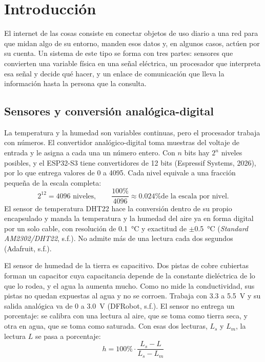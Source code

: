 \documentclass[12pt, letterpaper]{article}
\begin{document}
\newpage

\section{Introducción}

El internet de las cosas consiste en conectar objetos de uso diario a una red para que midan algo de su entorno, manden
esos datos y, en algunos casos, actúen por su cuenta. Un sistema de este tipo se forma con tres partes: sensores que
convierten una variable física en una señal eléctrica, un procesador que interpreta esa señal y decide qué hacer, y un
enlace de comunicación que lleva la información hasta la persona que la consulta.

\subsection{Sensores y conversión analógica-digital}

La temperatura y la humedad son variables continuas, pero el procesador trabaja con números. El convertidor
analógico-digital toma muestras del voltaje de entrada y le asigna a cada una un número entero. Con $n$ bits hay $2^n$
niveles posibles, y el ESP32-S3 tiene convertidores de 12 bits (Espressif Systems, 2026), por lo que entrega valores de
0 a 4095. Cada nivel equivale a una fracción pequeña de la escala completa:
\[
2^{12} = 4096 \text{ niveles}, \qquad \frac{100\text{\%}}{4096} \approx 0.024\text{\% de la escala por nivel.}
\]
El sensor de temperatura DHT22 hace la conversión dentro de su propio encapsulado y manda la temperatura y la humedad
del aire ya en forma digital por un solo cable, con resolución de \SI{0.1}{\celsius} y exactitud de
$\pm$\SI{0.5}{\celsius} (\textit{Standard AM2302/DHT22}, s.f.). No admite más de una lectura cada dos segundos
(Adafruit, s.f.).

El sensor de humedad de la tierra es capacitivo. Dos pistas de cobre cubiertas forman un capacitor cuya capacitancia
depende de la constante dieléctrica de lo que lo rodea, y el agua la aumenta mucho. Como no mide la conductividad, sus
pistas no quedan expuestas al agua y no se corroen. Trabaja con 3.3 a \SI{5.5}{\volt} y su salida analógica va de 0 a
\SI{3.0}{\volt} (DFRobot, s.f.). El sensor no entrega un porcentaje: se calibra con una lectura al aire, que se toma
como tierra seca, y otra en agua, que se toma como saturada. Con esas dos lecturas, $L_s$ y $L_m$, la lectura $L$ se
pasa a porcentaje:
\[
h = 100\text{\%} \cdot \frac{L_s - L}{L_s - L_m}
\]
\end{document}
